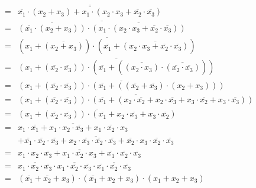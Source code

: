 \documentclass[DIN, pagenumber=false, fontsize=11pt, parskip=half]{scrartcl}
\begin{document}
\begin{enumerate}[label=(\alph*)]
\begin{eqnarray*}
                &=& \overline{\overline{\overline{x_1} \cdot (x_2 + x_3) + x_1 \cdot (x_2 \cdot x_3 + \overline{x_2} \cdot \overline{x_3})}}\\
                &=& \overline{\overline{(\overline{x_1} \cdot (x_2 + x_3))} \cdot \overline{(x_1 \cdot (x_2 \cdot x_3 + \overline{x_2} \cdot \overline{x_3}))}}\\
                &=& \overline{(x_1 + \overline{(x_2 + x_3)}) \cdot (\overline{x_1} + \overline{(x_2 \cdot x_3 + \overline{x_2} \cdot \overline{x_3})})}\\
                &=& \overline{(x_1 + (\overline{x_2} \cdot \overline{x_3})) \cdot (\overline{x_1} + (\overline{(x_2 \cdot x_3)} \cdot \overline{(\overline{x_2} \cdot \overline{x_3})}))}\\
                &=& \overline{(x_1 + (\overline{x_2} \cdot \overline{x_3})) \cdot (\overline{x_1} + ((\overline{x_2} + \overline{x_3}) \cdot (x_2 + x_3)))}\\
                &=& \overline{(x_1 + (\overline{x_2} \cdot \overline{x_3})) \cdot (\overline{x_1} + (x_2 \cdot \overline{x_2} + x_2 \cdot \overline{x_3} + x_3 \cdot \overline{x_2} + x_3 \cdot \overline{x_3}))}\\
                &=& \overline{(x_1 + (\overline{x_2} \cdot \overline{x_3})) \cdot (\overline{x_1} + x_2 \cdot \overline{x_3} + x_3 \cdot \overline{x_2})}\\
                &=& \overline{x_1 \cdot \overline{x_1} + x_1 \cdot x_2 \cdot \overline{x_3} + x_1 \cdot \overline{x_2} \cdot x_3} \\
                &&  \overline{+ \overline{x_1} \cdot \overline{x_2} \cdot \overline{x_3}
                    + x_2 \cdot \overline{x_3} \cdot \overline{x_2} \cdot \overline{x_3}
                    + \overline{x_2} \cdot x_3 \cdot \overline{x_2} \cdot \overline{x_3}}\\
                &=& \overline{x_1 \cdot x_2 \cdot \overline{x_3} + x_1 \cdot \overline{x_2} \cdot x_3 
                    + \overline{x_1} \cdot \overline{x_2} \cdot \overline{x_3}}\\
                &=& \overline{x_1 \cdot x_2 \cdot \overline{x_3}} \cdot \overline{x_1 \cdot \overline{x_2} \cdot \overline{x_3}}
                    \cdot \overline{\overline{x_1} \cdot \overline{x_2} \cdot \overline{x_3}}\\
                &=& (\overline{x_1} + \overline{x_2} + x_3) \cdot (\overline{x_1} + x_2 + x_3)
                    \cdot (x_1 + x_2 + x_3)\\

\end{eqnarray*}
\end{enumerate}
\end{document}
